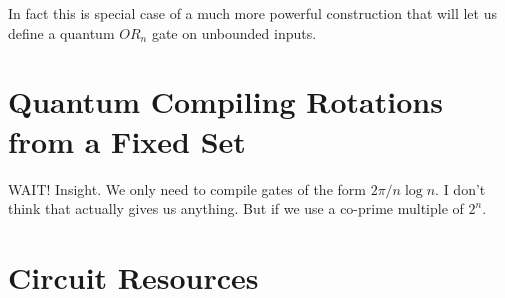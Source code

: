 In fact this is special case of a much more powerful construction
that will let us define a quantum $OR_n$ gate on unbounded inputs.

\section{Quantum Compiling Rotations from a Fixed Set}

WAIT! Insight. We only need to compile gates of the form
$2\pi / n\log n$. I don't think that actually gives us anything.
But if we use a co-prime multiple of $2^n$.

\section{Circuit Resources}
